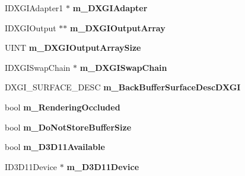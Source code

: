 \begin{DoxyCompactItemize}
\item 
\hypertarget{struct_d_x_u_t_state_1_1_s_t_a_t_e_ab23e716ab7dc82995641e5c9c1b2932a}{I\+D\+X\+G\+I\+Adapter1 $\ast$ {\bfseries m\+\_\+\+D\+X\+G\+I\+Adapter}}\label{struct_d_x_u_t_state_1_1_s_t_a_t_e_ab23e716ab7dc82995641e5c9c1b2932a}

\item 
\hypertarget{struct_d_x_u_t_state_1_1_s_t_a_t_e_ad7543d463554e5e0dc5235dac8efd027}{I\+D\+X\+G\+I\+Output $\ast$$\ast$ {\bfseries m\+\_\+\+D\+X\+G\+I\+Output\+Array}}\label{struct_d_x_u_t_state_1_1_s_t_a_t_e_ad7543d463554e5e0dc5235dac8efd027}

\item 
\hypertarget{struct_d_x_u_t_state_1_1_s_t_a_t_e_ae6d9634acda0af39e2acaade1ff7de9c}{U\+I\+N\+T {\bfseries m\+\_\+\+D\+X\+G\+I\+Output\+Array\+Size}}\label{struct_d_x_u_t_state_1_1_s_t_a_t_e_ae6d9634acda0af39e2acaade1ff7de9c}

\item 
\hypertarget{struct_d_x_u_t_state_1_1_s_t_a_t_e_a832dec035ea482ec1948ffaec4f703f7}{I\+D\+X\+G\+I\+Swap\+Chain $\ast$ {\bfseries m\+\_\+\+D\+X\+G\+I\+Swap\+Chain}}\label{struct_d_x_u_t_state_1_1_s_t_a_t_e_a832dec035ea482ec1948ffaec4f703f7}

\item 
\hypertarget{struct_d_x_u_t_state_1_1_s_t_a_t_e_af860615916d3ae4555b47444886d3252}{D\+X\+G\+I\+\_\+\+S\+U\+R\+F\+A\+C\+E\+\_\+\+D\+E\+S\+C {\bfseries m\+\_\+\+Back\+Buffer\+Surface\+Desc\+D\+X\+G\+I}}\label{struct_d_x_u_t_state_1_1_s_t_a_t_e_af860615916d3ae4555b47444886d3252}

\item 
\hypertarget{struct_d_x_u_t_state_1_1_s_t_a_t_e_adcda1f92440d470204f21210adff5172}{bool {\bfseries m\+\_\+\+Rendering\+Occluded}}\label{struct_d_x_u_t_state_1_1_s_t_a_t_e_adcda1f92440d470204f21210adff5172}

\item 
\hypertarget{struct_d_x_u_t_state_1_1_s_t_a_t_e_af7f223785d86ab0d7b915debfb9a9c6a}{bool {\bfseries m\+\_\+\+Do\+Not\+Store\+Buffer\+Size}}\label{struct_d_x_u_t_state_1_1_s_t_a_t_e_af7f223785d86ab0d7b915debfb9a9c6a}

\item 
\hypertarget{struct_d_x_u_t_state_1_1_s_t_a_t_e_a833806744e124f23728d857a49b9fa7a}{bool {\bfseries m\+\_\+\+D3\+D11\+Available}}\label{struct_d_x_u_t_state_1_1_s_t_a_t_e_a833806744e124f23728d857a49b9fa7a}

\item 
\hypertarget{struct_d_x_u_t_state_1_1_s_t_a_t_e_a1d6f895958ea8dcbdb0cfdba87512d2d}{I\+D3\+D11\+Device $\ast$ {\bfseries m\+\_\+\+D3\+D11\+Device}}\label{struct_d_x_u_t_state_1_1_s_t_a_t_e_a1d6f895958ea8dcbdb0cfdba87512d2d}


\end{DoxyCompactItemize}
